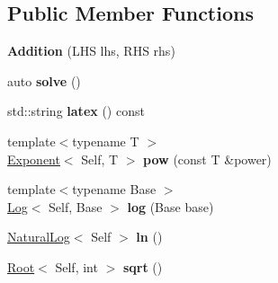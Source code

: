 \subsection*{\-Public \-Member \-Functions}
\begin{DoxyCompactItemize}
\item 
\hypertarget{classlatex_1_1math_1_1Addition_ade3a2eff41f8aaef8f77c2b2bb238b57}{{\bfseries \-Addition} (\-L\-H\-S lhs, \-R\-H\-S rhs)}\label{classlatex_1_1math_1_1Addition_ade3a2eff41f8aaef8f77c2b2bb238b57}

\item 
\hypertarget{classlatex_1_1math_1_1Addition_a69f19bb11a63d8631b6e0d246b994c00}{auto {\bfseries solve} ()}\label{classlatex_1_1math_1_1Addition_a69f19bb11a63d8631b6e0d246b994c00}

\item 
\hypertarget{classlatex_1_1math_1_1Addition_a03c226a26292f1203370bedf162731a0}{std\-::string {\bfseries latex} () const }\label{classlatex_1_1math_1_1Addition_a03c226a26292f1203370bedf162731a0}

\item 
\hypertarget{classlatex_1_1math_1_1Addition_aeb8aded4d72c95ac93539860321f2d0b}{{\footnotesize template$<$typename T $>$ }\\\hyperlink{classlatex_1_1math_1_1Exponent}{\-Exponent}$<$ \-Self, \-T $>$ {\bfseries pow} (const \-T \&power)}\label{classlatex_1_1math_1_1Addition_aeb8aded4d72c95ac93539860321f2d0b}

\item 
\hypertarget{classlatex_1_1math_1_1Addition_aeafa689b3df0a4c99396c3f5d12d40a5}{{\footnotesize template$<$typename Base $>$ }\\\hyperlink{classlatex_1_1math_1_1Log}{\-Log}$<$ \-Self, \-Base $>$ {\bfseries log} (\-Base base)}\label{classlatex_1_1math_1_1Addition_aeafa689b3df0a4c99396c3f5d12d40a5}

\item 
\hypertarget{classlatex_1_1math_1_1Addition_adf1963ebf74f64325555149dcefaf30a}{\hyperlink{classlatex_1_1math_1_1NaturalLog}{\-Natural\-Log}$<$ \-Self $>$ {\bfseries ln} ()}\label{classlatex_1_1math_1_1Addition_adf1963ebf74f64325555149dcefaf30a}

\item 
\hypertarget{classlatex_1_1math_1_1Addition_a8c94bab6a8b94636f0a1215d8690f273}{\hyperlink{classlatex_1_1math_1_1Root}{\-Root}$<$ \-Self, int $>$ {\bfseries sqrt} ()}\label{classlatex_1_1math_1_1Addition_a8c94bab6a8b94636f0a1215d8690f273}

\end{DoxyCompactItemize}
